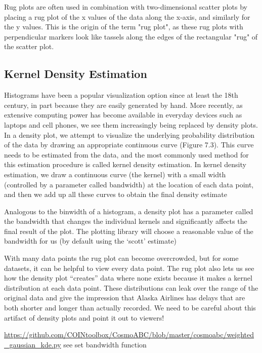 Rug plots are often used in combination with two-dimensional scatter plots by placing a rug plot of the x values of the data along the x-axis, and similarly for the y values. This is the origin of the term "rug plot", as these rug plots with perpendicular markers look like tassels along the edges of the rectangular "rug" of the scatter plot.

\subsection{Kernel Density Estimation}\label{sec:kde}

Histograms have been a popular visualization option since at least the 18th century, in part because they are easily generated by hand. More recently, as extensive computing power has become available in everyday devices such as laptops and cell phones, we see them increasingly being replaced by density plots. In a density plot, we attempt to visualize the underlying probability distribution of the data by drawing an appropriate continuous curve (Figure 7.3). This curve needs to be estimated from the data, and the most commonly used method for this estimation procedure is called kernel density estimation. In kernel density estimation, we draw a continuous curve (the kernel) with a small width (controlled by a parameter called bandwidth) at the location of each data point, and then we add up all these curves to obtain the final density estimate

Analogous to the binwidth of a histogram, a density plot has a parameter called the bandwidth that changes the individual kernels and significantly affects the final result of the plot. The plotting library will choose a reasonable value of the bandwidth for us (by default using the ‘scott’ estimate)

With many data points the rug plot can become overcrowded, but for some datasets, it can be helpful to view every data point. The rug plot also lets us see how the density plot “creates” data where none exists because it makes a kernel distribution at each data point. These distributions can leak over the range of the original data and give the impression that Alaska Airlines has delays that are both shorter and longer than actually recorded. We need to be careful about this artifact of density plots and point it out to viewers!


\url{https://github.com/COINtoolbox/CosmoABC/blob/master/cosmoabc/weighted_gaussian_kde.py} see set bandwidth function 


